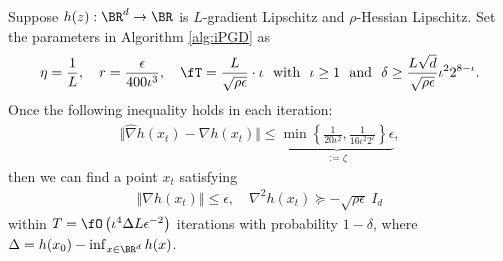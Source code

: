 \begin{thm}
    \label{thm:iPGD}
Suppose $h(z): \BR^d \rightarrow \BR$ is
$L$-gradient Lipschitz and $\rho$-Hessian Lipschitz. 
Set the parameters in Algorithm \ref{alg:iPGD} as 
\begin{align} \label{cond:iota}
    \eta = \frac{1}{L}, \quad r = \frac{\epsilon}{400 \iota^3}, \quad \fT = \frac{L}{\sqrt{\rho \epsilon}} \cdot \iota ~~{\rm with }~~ \iota \ge 1 ~~ {\rm and} ~~ \delta \ge  \frac{L \sqrt{d}}{\sqrt{\rho \epsilon}} \iota^2 2^{8-\iota}.
\end{align}
Once the following inequality holds in each
iteration:
\begin{align} \label{cond:PF2BA}
    \Vert \hat \nabla h(x_t) - \nabla h(x_t) \Vert \le \underbrace{\min \left\{ 
    \frac{1}{20 \iota^2},  \frac{1}{16 \iota^2 2^{\iota}} \right\} \epsilon}_{:=\zeta},
\end{align}
then we can find a point $x_t$ satisfying
\begin{align*}
    \Vert \nabla h(x_t) \Vert \le \epsilon, \quad  \nabla^2 h(x_t)  \succeq - \sqrt{\rho \epsilon}~ I_{d}
\end{align*}
within $T= \fO \left( {\iota^4  \Delta L}{\epsilon^{-2}}   \right)$ iterations with probability $1-\delta$, where
$\Delta = h(x_0) - \inf_{x \in \BR^{d}} h(x)$.    
\end{thm}


